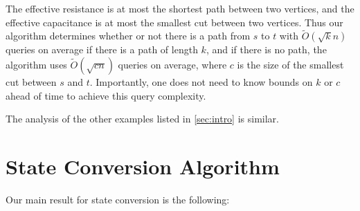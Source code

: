 \documentclass[cleveref, autoref, thm-restate,11pt]{article}
\theoremstyle{definition}
\begin{document}
The 
effective resistance is at most the shortest path between two vertices,
and the effective capacitance is at most the smallest cut between two
vertices. Thus
our algorithm determines whether or not there is a path from $s$ to
$t$ with $\tilde{O}(\sqrt{k}n)$ queries on average if there is a path of length $k$, and if there is no path,
the algorithm uses $\tilde{O}(\sqrt{cn})$ queries on average, where $c$ is the size of
the smallest cut between $s$ and $t$. Importantly, one does not need to know
bounds on $k$ or $c$ ahead of time to achieve this query complexity.

The analysis of the other examples listed in \cref{sec:intro} is similar.






\section{State Conversion Algorithm}\label{sec:StateConv}

Our main result for state conversion is the following: 
\end{document}

